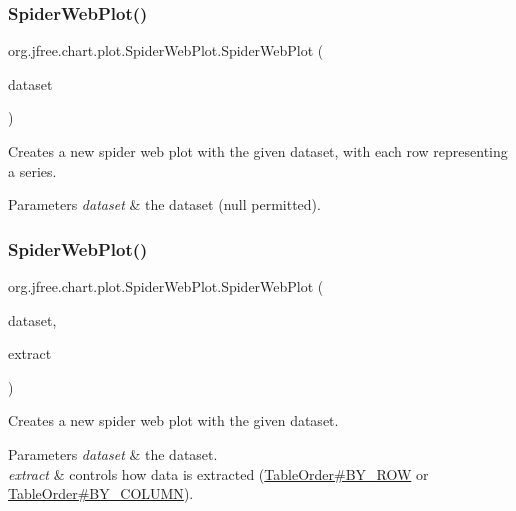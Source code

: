 \subsubsection{\texorpdfstring{Spider\+Web\+Plot()}{SpiderWebPlot()}\hspace{0.1cm}{\footnotesize\ttfamily [2/3]}}
{\footnotesize\ttfamily org.\+jfree.\+chart.\+plot.\+Spider\+Web\+Plot.\+Spider\+Web\+Plot (\begin{DoxyParamCaption}\item[{\mbox{\hyperlink{interfaceorg_1_1jfree_1_1data_1_1category_1_1_category_dataset}{Category\+Dataset}}}]{dataset }\end{DoxyParamCaption})}

Creates a new spider web plot with the given dataset, with each row representing a series.


\begin{DoxyParams}{Parameters}
{\em dataset} & the dataset ({\ttfamily null} permitted). \\
\hline
\end{DoxyParams}
\mbox{\label{classorg_1_1jfree_1_1chart_1_1plot_1_1_spider_web_plot_a37967a697040475aa654713cc8f32a9e}} 
\subsubsection{\texorpdfstring{Spider\+Web\+Plot()}{SpiderWebPlot()}\hspace{0.1cm}{\footnotesize\ttfamily [3/3]}}
{\footnotesize\ttfamily org.\+jfree.\+chart.\+plot.\+Spider\+Web\+Plot.\+Spider\+Web\+Plot (\begin{DoxyParamCaption}\item[{\mbox{\hyperlink{interfaceorg_1_1jfree_1_1data_1_1category_1_1_category_dataset}{Category\+Dataset}}}]{dataset,  }\item[{Table\+Order}]{extract }\end{DoxyParamCaption})}

Creates a new spider web plot with the given dataset.


\begin{DoxyParams}{Parameters}
{\em dataset} & the dataset. \\
\hline
{\em extract} & controls how data is extracted (\mbox{\hyperlink{}{Table\+Order\#\+B\+Y\+\_\+\+R\+OW}} or \mbox{\hyperlink{}{Table\+Order\#\+B\+Y\+\_\+\+C\+O\+L\+U\+MN}}). \\
\hline
\end{DoxyParams}


